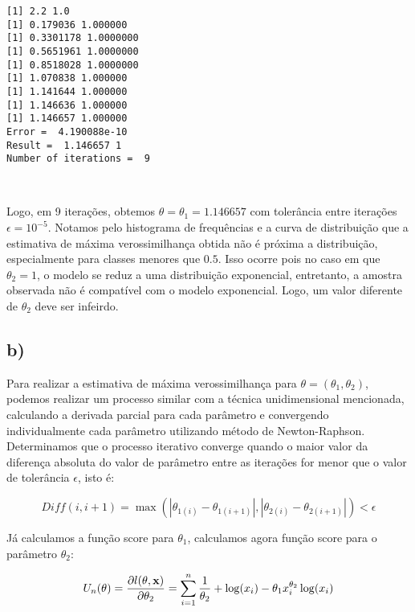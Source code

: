 \documentclass[11pt]{article}
\begin{document}
    \begin{Verbatim}[commandchars=\\\{\}]
[1] 2.2 1.0
[1] 0.179036 1.000000
[1] 0.3301178 1.0000000
[1] 0.5651961 1.0000000
[1] 0.8518028 1.0000000
[1] 1.070838 1.000000
[1] 1.141644 1.000000
[1] 1.146636 1.000000
[1] 1.146657 1.000000
Error =  4.190088e-10 
Result =  1.146657 1 
Number of iterations =  9 

    \end{Verbatim}

    \begin{center}
    \end{center}
    { \hspace*{\fill} \\}
    
    Logo, em 9 iterações, obtemos \(\theta = \theta_1 = 1.146657\) com
tolerância entre iterações \(\epsilon = 10^{-5}\). Notamos pelo
histograma de frequências e a curva de distribuição que a estimativa de
máxima verossimilhança obtida não é próxima a distribuição,
especialmente para classes menores que \(0.5\). Isso ocorre pois no caso
em que \(\theta_2 = 1\), o modelo se reduz a uma distribuição
exponencial, entretanto, a amostra observada não é compatível com o
modelo exponencial. Logo, um valor diferente de \(\theta_2\) deve ser
infeirdo.

    \hypertarget{b}{%
\subsection{b)}\label{b}}

Para realizar a estimativa de máxima verossimilhança para
\(\theta = (\theta_1 , \theta_2)\), podemos realizar um processo similar
com a técnica unidimensional mencionada, calculando a derivada parcial
para cada parâmetro e convergendo individualmente cada parâmetro
utilizando método de Newton-Raphson. Determinamos que o processo
iterativo converge quando o maior valor da diferença absoluta do valor
de parâmetro entre as iterações for menor que o valor de tolerância
\(\epsilon\), isto é:

\[ Diff(i, i+1) = \max (|\theta_{1(i)} - \theta_{1(i + 1)}|, |\theta_{2(i)} - \theta_{2(i + 1)}|) < \epsilon\]

Já calculamos a função score para \(\theta_1\), calculamos agora função
score para o parâmetro \(\theta_2\):

\[ U_n({\theta}) = \frac{\partial l(\bf{\theta}, \bf{x})}{\partial \theta_2} = \sum_{i = 1}^{n} \frac{1}{\theta_2} + \log(x_ i) - \theta_1 x_ i^{\theta_2}\log(x_ i)\]
\end{document}
